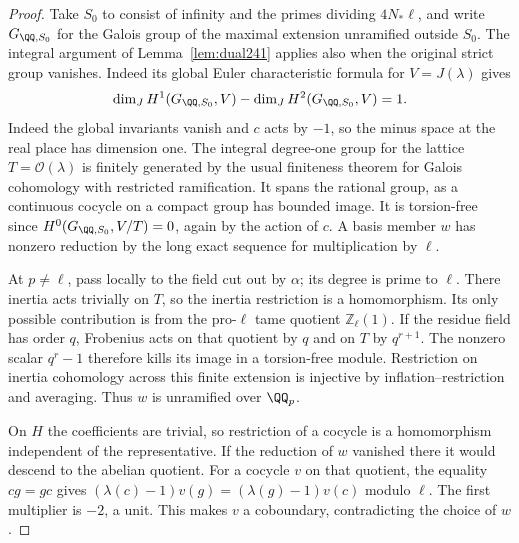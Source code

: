 \documentclass[a4paper,11pt]{article}
\theoremstyle{definition}
\theoremstyle{remark}
\newcommand{\ZZ}{\mathbb Z}\newcommand{\ord}{\operatorname{ord}}
\numberwithin{equation}{section}
\newcommand{\OO}{\mathcal O}
\begin{document}
\begin{proof}
Take \(S_0\) to consist of infinity and the primes dividing
\(4N_*\ell\), and write \(G_{\QQ,S_0}\) for the Galois group of the
maximal extension unramified outside \(S_0\). The integral argument
of Lemma~\ref{lem:dual241} applies also when the original strict
group vanishes. Indeed its global Euler characteristic formula for
\(V=J(\lambda)\) gives
\[
    \dim_J H^1(G_{\QQ,S_0},V)-\dim_J H^2(G_{\QQ,S_0},V)=1 .
\]
Indeed the global invariants vanish and \(c\) acts by \(-1\), so
the minus space at the real place has dimension one. The integral
degree-one group for the lattice \(T=\OO(\lambda)\) is finitely
generated by the usual finiteness theorem for Galois cohomology
with restricted ramification. It spans the rational group, as a
continuous cocycle on a compact group has bounded image. It is
torsion-free since \(H^0(G_{\QQ,S_0},V/T)=0\), again by the action
of \(c\). A basis member \(w\) has nonzero reduction by the long
exact sequence for multiplication by \(\ell\).~\cite{IV-II-II-duality13}

At \(p\ne\ell\), pass locally to the field cut out by \(\alpha\);
its degree is prime to \(\ell\). There inertia acts trivially on
\(T\), so the inertia restriction is a homomorphism. Its only possible
contribution is from the pro-\(\ell\) tame quotient \(\ZZ_\ell(1)\).
If the residue field has order \(q\), Frobenius acts on that quotient
by \(q\) and on \(T\) by \(q^{r+1}\). The nonzero scalar \(q^r-1\)
therefore kills its image in a torsion-free module. Restriction on
inertia cohomology across this finite extension is injective by
inflation--restriction and averaging. Thus \(w\) is unramified
over \(\QQ_p\).

On \(H\) the coefficients are trivial, so restriction of a cocycle
is a homomorphism independent of the representative. If the reduction
of \(w\) vanished there it would descend to the abelian quotient.
For a cocycle \(v\) on that quotient, the equality \(cg=gc\) gives
\((\lambda(c)-1)v(g)=(\lambda(g)-1)v(c)\) modulo \(\ell\).
The first multiplier is \(-2\), a unit. This makes \(v\) a
coboundary, contradicting the choice of \(w\).
\end{proof}
\end{document}
